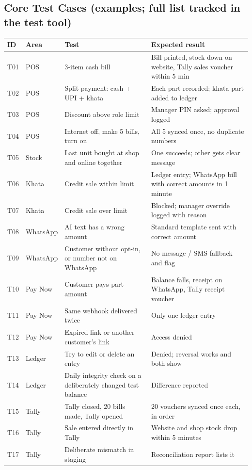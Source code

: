 \documentclass[11pt,a4paper]{article}
\newcommand{\hdr}{\rowcolor{hdrgray}\bfseries}
\begin{document}
\subsection{Core Test Cases (examples; full list tracked in the test tool)}
{\small
\begin{longtable}{L{1cm}L{2cm}L{6cm}L{7.5cm}}
\hdr ID & Area & Test & Expected result \\ \endhead
T01 & POS & 3-item cash bill & Bill printed, stock down on website, Tally sales voucher within 5 min \\
T02 & POS & Split payment: cash + UPI + khata & Each part recorded; khata part added to ledger \\
T03 & POS & Discount above role limit & Manager PIN asked; approval logged \\
T04 & POS & Internet off, make 5 bills, turn on & All 5 synced once, no duplicate numbers \\
T05 & Stock & Last unit bought at shop and online together & One succeeds; other gets clear message \\
T06 & Khata & Credit sale within limit & Ledger entry; WhatsApp bill with correct amounts in 1 minute \\
T07 & Khata & Credit sale over limit & Blocked; manager override logged with reason \\
T08 & WhatsApp & AI text has a wrong amount & Standard template sent with correct amount \\
T09 & WhatsApp & Customer without opt-in, or number not on WhatsApp & No message / SMS fallback and flag \\
T10 & Pay Now & Customer pays part amount & Balance falls, receipt on WhatsApp, Tally receipt voucher \\
T11 & Pay Now & Same webhook delivered twice & Only one ledger entry \\
T12 & Pay Now & Expired link or another customer's link & Access denied \\
T13 & Ledger & Try to edit or delete an entry & Denied; reversal works and both show \\
T14 & Ledger & Daily integrity check on a deliberately changed test balance & Difference reported \\
T15 & Tally & Tally closed, 20 bills made, Tally opened & 20 vouchers synced once each, in order \\
T16 & Tally & Sale entered directly in Tally & Website and shop stock drop within 5 minutes \\
T17 & Tally & Deliberate mismatch in staging & Reconciliation report lists it \\

\end{longtable}}
\end{document}
